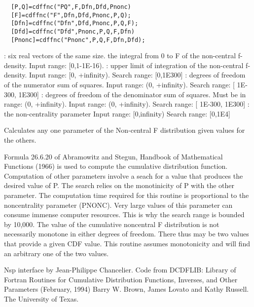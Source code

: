 \begin{mandesc}
\end{mandesc}
\label{cdffnc}
\begin{calling_sequence}
\begin{verbatim}
  [P,Q]=cdffnc("PQ",F,Dfn,Dfd,Pnonc)  
  [F]=cdffnc("F",Dfn,Dfd,Pnonc,P,Q);  
  [Dfn]=cdffnc("Dfn",Dfd,Pnonc,P,Q,F);  
  [Dfd]=cdffnc("Dfd",Pnonc,P,Q,F,Dfn)  
  [Pnonc]=cdffnc("Pnonc",P,Q,F,Dfn,Dfd);  
\end{verbatim}
\end{calling_sequence}
\begin{parameters}
  \begin{varlist}
    : six real vectors of the same size.
     the integral from 0 to F of the non-central f-density. Input range: [0,1-1E-16).
      : upper limit of integration of the non-central f-density. Input range: [0, +infinity). Search range: [0,1E300]
        : degrees of freedom of the numerator sum of squares. Input range: (0, +infinity). Search range: [ 1E-300, 1E300]
        : degrees of freedom of the denominator sum of squares. Must be in range: (0, +infinity). Input range: (0, +infinity). Search range: [ 1E-300, 1E300]
        : the non-centrality parameter Input range: [0,infinity) Search range: [0,1E4]
  \end{varlist}
\end{parameters}
\begin{mandescription}
  Calculates any one parameter of the Non-central F distribution given values for the others.

  Formula  26.6.20   of   Abramowitz   and   Stegun,  Handbook  of
  Mathematical  Functions (1966) is used to compute the cumulative
  distribution function.
  Computation of other parameters involve a seach for a value that
  produces  the desired  value  of P.   The search relies  on  the
  monotinicity of P with the other parameter.
  The computation time  required for this  routine is proportional
  to the noncentrality  parameter  (PNONC).  Very large  values of
  this parameter can consume immense  computer resources.  This is
  why the search range is bounded by 10,000.
  The  value  of the  cumulative  noncentral F distribution is not
  necessarily monotone in either degrees  of freedom.  There  thus
  may be two values that provide a given  CDF value.  This routine
  assumes monotonicity  and will find  an arbitrary one of the two
  values.
\end{mandescription}

\begin{authors}
  Nsp interface by Jean-Philippe Chancelier. Code from DCDFLIB: 
  Library of Fortran Routines for Cumulative Distribution
  Functions, Inverses, and Other Parameters (February, 1994)
  Barry W. Brown, James Lovato and Kathy Russell. The University of Texas.
\end{authors}
